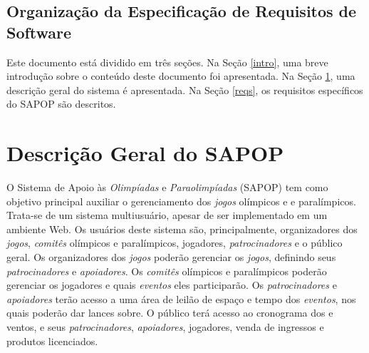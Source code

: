 \documentclass[
10pt, %
a4paper, %
oneside, %
headinclude,footinclude, %
BCOR5mm, %
]{scrartcl}
\begin{document}
\subsection{Organização da Especificação de Requisitos de Software}
Este documento está dividido em três seções. Na Seção \ref{intro}, uma breve introdução sobre
o conteúdo deste documento foi apresentada. Na Seção \ref{desc}, uma descrição geral do sistema
é apresentada. Na Seção \ref{reqs}, os requisitos específicos do SAPOP são descritos.


\section{Descrição Geral do SAPOP}\label{desc}
O Sistema de Apoio às \textit{Olimpíadas} e \textit{Paraolimpíadas} (SAPOP) tem como objetivo principal
auxiliar o gerenciamento dos \textit{jogos} olímpicos e e paralímpicos. Trata-se de um sistema
multiusuário, apesar de ser implementado em um ambiente Web. Os usuários deste sistema
são, principalmente, organizadores dos \textit{jogos}, \textit{comitês} olímpicos e paralímpicos, jogadores,
\textit{patrocinadores} e o público geral. Os organizadores dos \textit{jogos} poderão gerenciar os \textit{jogos},
definindo seus \textit{patrocinadores} e \textit{apoiadores}. Os \textit{comitês} olímpicos e paralímpicos poderão
gerenciar os jogadores e quais \textit{eventos} eles participarão. Os \textit{patrocinadores} e \textit{apoiadores}
terão acesso a uma área de leilão de espaço e tempo dos \textit{eventos}, nos quais poderão dar
lances sobre. O público terá acesso ao cronograma dos e ventos, e seus \textit{patrocinadores},
\textit{apoiadores}, jogadores, venda de ingressos e produtos licenciados.
\end{document}
